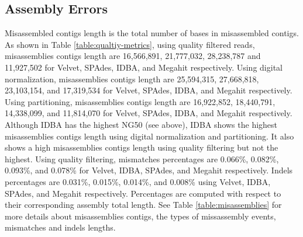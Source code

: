 



\subsection*{Assembly Errors} 

 
Misassembled contigs length is the total number of bases in misassembled contigs.  As shown in Table \ref {table:qualtiy-metrics}, using quality filtered reads, misassemblies contigs length are 16,566,891, 21,777,032, 28,238,787 and 11,927,502 for Velvet, SPAdes, IDBA, and Megahit respectively. 
Using digital normalization,  misassemblies contigs length are 25,594,315, 27,668,818, 23,103,154, and 17,319,534 for Velvet, SPAdes, IDBA, and Megahit respectively.  Using partitioning,  misassemblies contigs length are 16,922,852, 18,440,791, 14,338,099, and 11,814,070 for Velvet, SPAdes, IDBA, and Megahit respectively. 
Although IDBA has the highest NG50 (see above), IDBA shows the highest misassemblies contigs length using digital normalization and partitioning. It also shows a high misassemblies contigs length using quality filtering but not the highest.
Using quality filtering, mismatches percentages are 0.066\%, 0.082\%, 0.093\%, and 0.078\% for Velvet, IDBA, SPAdes, and Megahit respectively. Indels percentages are 0.031\%, 0.015\%, 0.014\%, and 0.008\% using Velvet, IDBA, SPAdes, and Megahit respectively. Percentages are computed with respect to their corresponding assembly total length. See Table \ref{table:misassemblies}  for more details about misassemblies contigs, the types of missassembly events, mismatches and indels lengths.



